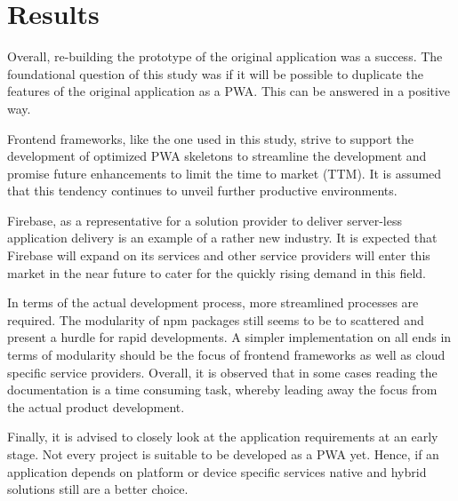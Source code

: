 \chapter{Results}

Overall, re-building the prototype of the original application was a success. The foundational question of this study was if it will be possible to duplicate the features of the original application as a PWA. This can be answered in a positive way.

Frontend frameworks, like the one used in this study, strive to support the development of optimized PWA skeletons to streamline the development and promise future enhancements to limit the time to market (TTM). It is assumed that this tendency continues to unveil further productive environments.

Firebase, as a representative for a solution provider to deliver server-less application delivery is an example of a rather new industry. It is expected that Firebase will expand on its services and other service providers will enter this market in the near future to cater for the quickly rising demand in this field.

In terms of the actual development process, more streamlined processes are required. The modularity of npm packages still seems to be to scattered and present a hurdle for rapid developments. A simpler implementation on all ends in terms of modularity should be the focus of frontend frameworks as well as cloud specific service providers. Overall, it is observed that in some cases reading the documentation is a time consuming task, whereby leading away the focus from the actual product development.

Finally, it is advised to closely look at the application requirements at an early stage. Not every project is suitable to be developed as a PWA yet. Hence, if an application depends on platform or device specific services native and hybrid solutions still are a better choice.
